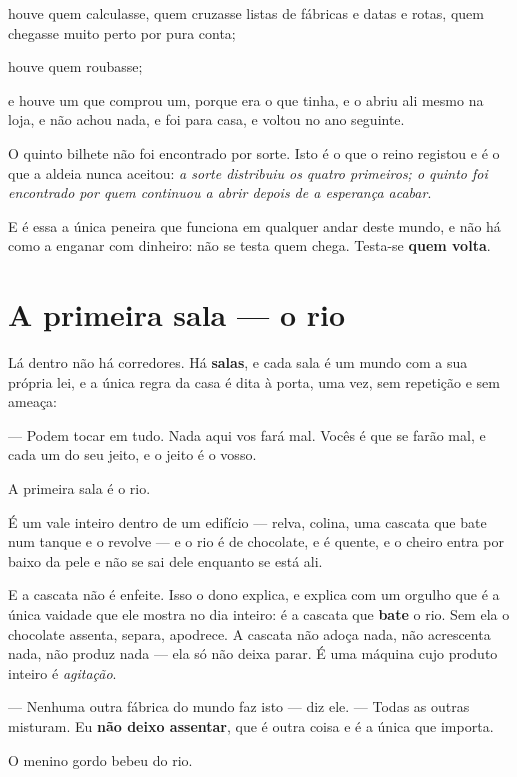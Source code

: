 \documentclass[livro.tex]{subfiles}
\begin{document}
houve quem calculasse, quem cruzasse listas de fábricas e datas e rotas, quem chegasse
muito perto por pura conta;

houve quem roubasse;

e houve um que comprou um, porque era o que tinha, e o abriu ali mesmo na loja, e não
achou nada, e foi para casa, e voltou no ano seguinte.

\medskip

O quinto bilhete não foi encontrado por sorte. Isto é o que o reino registou e é o que a
aldeia nunca aceitou: \emph{a sorte distribuiu os quatro primeiros; o quinto foi
encontrado por quem continuou a abrir depois de a esperança acabar}.

E é essa a única peneira que funciona em qualquer andar deste mundo, e não há como a
enganar com dinheiro: não se testa quem chega. Testa-se \textbf{quem volta}.

\chapter{A primeira sala --- o rio}

Lá dentro não há corredores. Há \textbf{salas}, e cada sala é um mundo com a sua própria
lei, e a única regra da casa é dita à porta, uma vez, sem repetição e sem ameaça:

--- Podem tocar em tudo. Nada aqui vos fará mal. Vocês é que se farão mal, e cada um do
seu jeito, e o jeito é o vosso.

\medskip

A primeira sala é o rio.

É um vale inteiro dentro de um edifício --- relva, colina, uma cascata que bate num
tanque e o revolve --- e o rio é de chocolate, e é quente, e o cheiro entra por baixo da
pele e não se sai dele enquanto se está ali.

E a cascata não é enfeite. Isso o dono explica, e explica com um orgulho que é a única
vaidade que ele mostra no dia inteiro: é a cascata que \textbf{bate} o rio. Sem ela o
chocolate assenta, separa, apodrece. A cascata não adoça nada, não acrescenta nada, não
produz nada --- ela só não deixa parar. É uma máquina cujo produto inteiro é
\emph{agitação}.

--- Nenhuma outra fábrica do mundo faz isto --- diz ele. --- Todas as outras misturam. Eu
\textbf{não deixo assentar}, que é outra coisa e é a única que importa.

\medskip

O menino gordo bebeu do rio.
\end{document}
